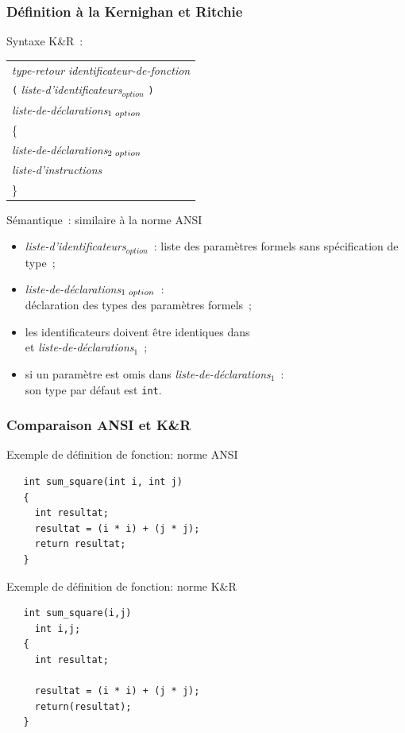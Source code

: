 \begin{frame}[fragile]
  \frametitle{D\'efinition \`a la Kernighan et Ritchie}
  \begin{center}
  \alert{Syntaxe K\&R}~:     \begin{tabular}[t]{l}
      {\it type-retour} \; {\it identificateur-de-fonction} \\
      {\tt (} \; {\it liste-d'identificateurs\/$_{option}$} \; {\tt )}\\
      {\it liste-de-d\'{e}clarations\/$_{1 \hspace{1mm}option}$}\\
      \{ \\
      {\it liste-de-d\'{e}clarations\/$_{2 \hspace{1mm}option}$}\\
      {\it liste-d'instructions}\\
      \}
    \end{tabular}
  \end{center}
  \alert{S\'{e}mantique~: similaire \`a la norme ANSI}
  \begin{itemize}
  \item {\it liste-d'identificateurs\/$_{option}$}~: liste des
    param\`etres formels sans sp\'ecification de type~;
  \item {\it liste-de-d\'{e}clarations\/$_{1\hspace{1mm}option}$}~:\\
    \quad d\'eclaration des types des param\`etres formels~;
  \item les identificateurs doivent \^etre identiques dans \\
     et
    {\it liste-de-d\'{e}clarations\/$_1$}~;
  \item si un param\`etre est omis dans {\it
      liste-de-d\'{e}clarations\/$_1$}~: \\
    \quad son type par d\'efaut est {\tt int}.
\end{itemize}
\end{frame}
\begin{frame}[fragile]
    \frametitle{Comparaison ANSI et K\&R}
 Exemple de d\'efinition de fonction: norme ANSI
 \par\bigskip
\begin{verbatim}
   int sum_square(int i, int j) 
   {
     int resultat;
     resultat = (i * i) + (j * j);
     return resultat;
   }
\end{verbatim}
\par\bigskip
 Exemple de d\'efinition de fonction: norme K\&R
\par\bigskip
\begin{verbatim}
   int sum_square(i,j)
     int i,j;           
   {
     int resultat;  

     resultat = (i * i) + (j * j);
     return(resultat);
   }
\end{verbatim}

\end{frame}
